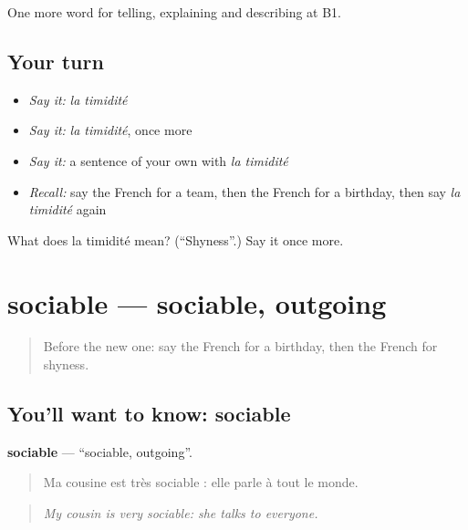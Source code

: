 \begin{grammarlens}[title={What you've built}]
One more word for telling, explaining and describing at B1.
\end{grammarlens}

\subsection*{Your turn}
\begin{itemize}
\raggedright
  \item \emph{Say it:} \emph{la timidité}
  \item \emph{Say it:} \emph{la timidité}, once more
  \item \emph{Say it:} a sentence of your own with \emph{la timidité}
  \item \emph{Recall:} say the French for a team, then the French for a birthday, then say \emph{la timidité} again
\end{itemize}

\begin{tcolorbox}[breakable,colback=teal!4,colframe=teal!35!black,title={Before you move on}]
What does la timidité mean? (\textquotedblleft{}Shyness\textquotedblright{}.) Say it once more.
\end{tcolorbox}
\section[sociable]{sociable — sociable, outgoing}

\label{lesson:FR-C466-sociable}



\begin{quote}
Before the new one: say the French for a birthday, then the French for shyness.
\end{quote}

\subsection*{You'll want to know: sociable}
\textbf{sociable} — \textquotedblleft{}sociable, outgoing\textquotedblright{}.

\begin{quote}
Ma cousine est très sociable : elle parle à tout le monde.
\end{quote}

\begin{quote}
\emph{My cousin is very sociable: she talks to everyone.}
\end{quote}

